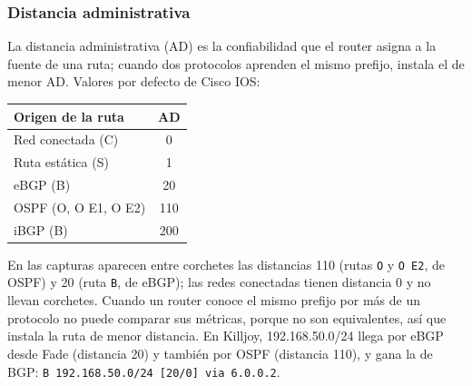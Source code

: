 \subsubsection*{Distancia administrativa}

La distancia administrativa (AD) es la confiabilidad que el router asigna a la fuente de una ruta; cuando dos protocolos aprenden el mismo prefijo, instala el de menor AD. Valores por defecto de Cisco IOS:

\begin{center}
\begin{tabular}{@{}lc@{}}
  \toprule
  Origen de la ruta & AD \\
  \midrule
  Red conectada (C) & 0 \\
  Ruta estática (S) & 1 \\
  eBGP (B) & 20 \\
  OSPF (O, O E1, O E2) & 110 \\
  iBGP (B) & 200 \\
  \bottomrule
\end{tabular}
\end{center}


En las capturas aparecen entre corchetes las distancias 110 (rutas \texttt{O} y \texttt{O E2}, de OSPF) y 20 (ruta \texttt{B}, de eBGP); las redes conectadas tienen distancia 0 y no llevan corchetes. Cuando un router conoce el mismo prefijo
por más de un protocolo no puede comparar sus métricas, porque no son equivalentes, así que instala la ruta de menor distancia. En Killjoy, 192.168.50.0/24 llega por eBGP desde Fade (distancia 20) y también por OSPF (distancia 110), y gana la de BGP: \texttt{B 192.168.50.0/24 [20/0] via 6.0.0.2}.